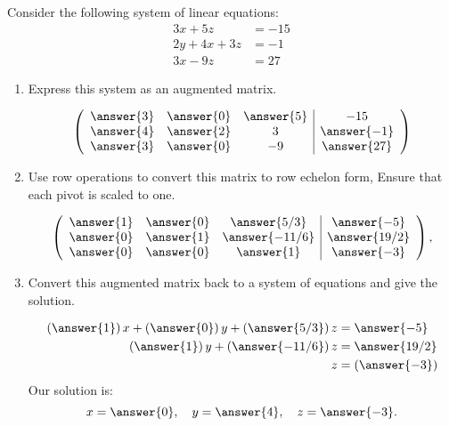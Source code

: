 \documentclass[handout]{ximera}
\author{Parisa Fatheddin}
\begin{document}
\begin{exercise}
Consider the following system of linear equations:
\begin{align*}
      3x + 5z &=  -15 \\
     2y+4x+3z&= -1\\
     3x -9z&= 27
\end{align*}
\begin{enumerate}
\item Express this system as an augmented matrix.
\begin{prompt}
\[
\left(\begin{array}{ccc|c}
  \answer{3} &  \answer{0} & \answer{5} &-15 \\
  \answer{4} & \answer{2} & 3 & \answer{-1} \\
  \answer{3} &  \answer{0} & -9 & \answer{27}
\end{array}\right)
\]
\end{prompt}
\item Use row operations to convert this matrix to row echelon form,
  Ensure that each pivot is scaled to one.
\begin{prompt}
\[
\left(\begin{array}{ccc|c}
  \answer{1} &  \answer{0} & \answer{5/3} &\answer{-5} \\
  \answer{0} & \answer{1} & \answer{-11/6} & \answer{19/2} \\
  \answer{0} &  \answer{0} & \answer{1} & \answer{-3}
\end{array}\right),
\]
\end{prompt}
\item Convert this augmented matrix back to a system of equations
and give the solution.
\begin{prompt}
\begin{align*}
      \left(\answer{1}\right)x + \left(\answer{0}\right)y + \left(\answer{5/3}\right)z &= \answer{-5} \\
     \left(\answer{1}\right)y+\left(\answer{-11/6}\right)z&=\answer{19/2}\\
     z&=\left(\answer{-3}\right)
\end{align*}
Our solution is:
\[
x= \answer{0}, \quad y= \answer{4}, \quad z=\answer{-3}.
\]
\end{prompt}
\end{enumerate}
\end{exercise}
\end{document}
